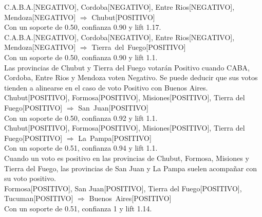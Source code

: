 \documentclass{endm}
\begin{document}
{C.A.B.A.[NEGATIVO],                            Cordoba[NEGATIVO],                              Entre Rios[NEGATIVO],                           Mendoza[NEGATIVO]}  $\Longrightarrow$ {Chubut[POSITIVO]} \\

Con un soporte de 0.50, confianza 0.90 y lift 1.17.  \\

{C.A.B.A.[NEGATIVO],                            Cordoba[NEGATIVO],                             Entre Rios[NEGATIVO],                           Mendoza[NEGATIVO]} $\Longrightarrow$ {Tierra\ del\ Fuego[POSITIVO]}  \\

Con un soporte de 0.50, confianza 0.90 y lift 1.1.  \\

Las provincias de Chubut y Tierra del Fuego votarán Positivo cuando CABA, Cordoba, Entre Rios y Mendoza voten Negativo. Se puede deducir que sus votos tienden a alinearse en el caso de voto Positivo con Buenos Aires. \\


{Chubut[POSITIVO],                              Formosa[POSITIVO],                              Misiones[POSITIVO],                             Tierra del Fuego[POSITIVO]} $\Longrightarrow$ {San\ Juan[POSITIVO]}  \\    


Con un soporte de 0.50, confianza 0.92 y lift 1.1. \\

{Chubut[POSITIVO],                              Formosa[POSITIVO],                              Misiones[POSITIVO],                             Tierra del Fuego[POSITIVO]} $\Longrightarrow$ {La\ Pampa[POSITIVO]}  \\

Con un soporte de 0.51, confianza 0.94 y lift 1.1. \\

Cuando un voto es positivo en las provincias de Chubut, Formosa, Misiones y Tierra del Fuego, las provincias de San Juan y La Pampa suelen acompañar con su voto positivo. \\


{Formosa[POSITIVO],                             San Juan[POSITIVO],                             Tierra del Fuego[POSITIVO],                     Tucuman[POSITIVO]} $\Longrightarrow$ {Buenos\ Aires[POSITIVO]} \\

Con un soporte de 0.51, confianza 1 y lift 1.14. \\
\end{document}
